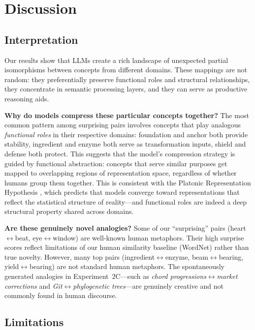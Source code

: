 \section{Discussion}
\label{sec:discussion}

\subsection{Interpretation}

Our results show that LLMs create a rich landscape of unexpected partial isomorphisms between concepts from different domains.
These mappings are not random: they preferentially preserve functional roles and structural relationships, they concentrate in semantic processing layers, and they can serve as productive reasoning aids.

{\bf Why do models compress these particular concepts together?}
The most common pattern among surprising pairs involves concepts that play analogous \emph{functional roles} in their respective domains: foundation and anchor both provide stability, ingredient and enzyme both serve as transformation inputs, shield and defense both protect.
This suggests that the model's compression strategy is guided by functional abstraction: concepts that serve similar purposes get mapped to overlapping regions of representation space, regardless of whether humans group them together.
This is consistent with the Platonic Representation Hypothesis \citep{huh2024platonic}, which predicts that models converge toward representations that reflect the statistical structure of reality---and functional roles are indeed a deep structural property shared across domains.

{\bf Are these genuinely novel analogies?}
Some of our ``surprising'' pairs (\eg heart$\leftrightarrow$beat, eye$\leftrightarrow$window) are well-known human metaphors.
Their high surprise scores reflect limitations of our human similarity baseline (WordNet) rather than true novelty.
However, many top pairs (\eg ingredient$\leftrightarrow$enzyme, beam$\leftrightarrow$bearing, yield$\leftrightarrow$bearing) are not standard human metaphors.
The spontaneously generated analogies in Experiment~2C---such as \emph{chord progressions}$\leftrightarrow$\emph{market corrections} and \emph{Git}$\leftrightarrow$\emph{phylogenetic trees}---are genuinely creative and not commonly found in human discourse.

\subsection{Limitations}


